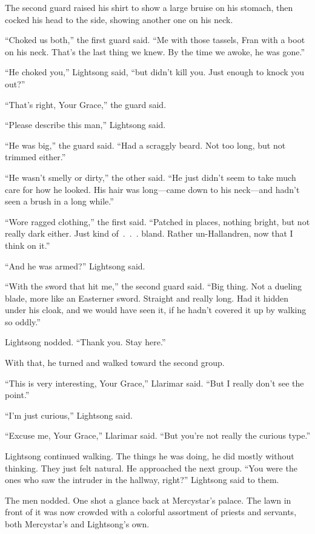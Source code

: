 The second guard raised his shirt to show a large bruise on his stomach, then cocked his head to the side, showing another one on his neck.

“Choked us both,” the first guard said. “Me with those tassels, Fran with a boot on his neck. That’s the last thing we knew. By the time we awoke, he was gone.”

“He choked you,” Lightsong said, “but didn’t kill you. Just enough to knock you out?”

“That’s right, Your Grace,” the guard said.

“Please describe this man,” Lightsong said.

“He was big,” the guard said. “Had a scraggly beard. Not too long, but not trimmed either.”

“He wasn’t smelly or dirty,” the other said. “He just didn’t seem to take much care for how he looked. His hair was long—came down to his neck—and hadn’t seen a brush in a long while.”

“Wore ragged clothing,” the first said. “Patched in places, nothing bright, but not really dark either. Just kind of~.~.~. bland. Rather un-Hallandren, now that I think on it.”

“And he was armed?” Lightsong said.

“With the sword that hit me,” the second guard said. “Big thing. Not a dueling blade, more like an Easterner sword. Straight and really long. Had it hidden under his cloak, and we would have seen it, if he hadn’t covered it up by walking so oddly.”

Lightsong nodded. “Thank you. Stay here.”

With that, he turned and walked toward the second group.

“This is very interesting, Your Grace,” Llarimar said. “But I really don’t see the point.”

“I’m just curious,” Lightsong said.

“Excuse me, Your Grace,” Llarimar said. “But you’re not really the curious type.”

Lightsong continued walking. The things he was doing, he did mostly without thinking. They just felt natural. He approached the next group. “You were the ones who saw the intruder in the hallway, right?” Lightsong said to them.

The men nodded. One shot a glance back at Mercystar’s palace. The lawn in front of it was now crowded with a colorful assortment of priests and servants, both Mercystar’s and Lightsong’s own.

